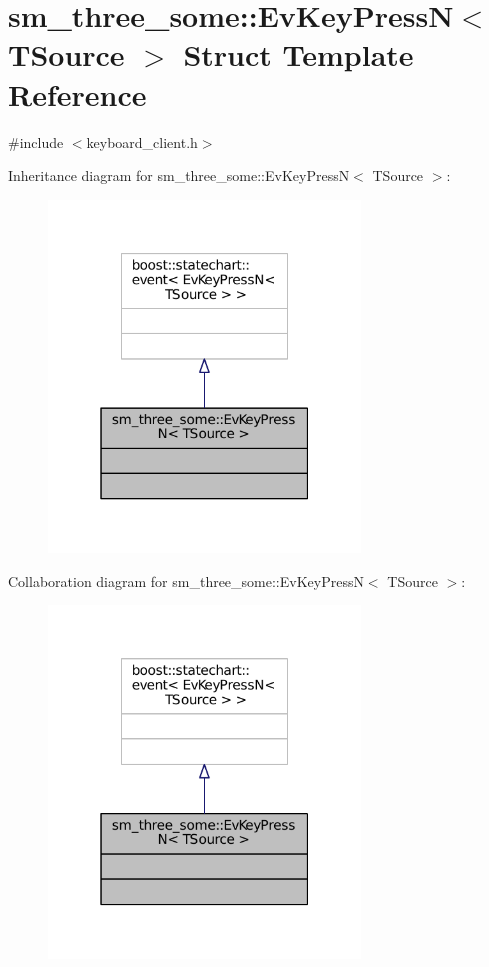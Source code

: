 \hypertarget{structsm__three__some_1_1EvKeyPressN}{}\section{sm\+\_\+three\+\_\+some\+:\+:Ev\+Key\+PressN$<$ T\+Source $>$ Struct Template Reference}
\label{structsm__three__some_1_1EvKeyPressN}


{\ttfamily \#include $<$keyboard\+\_\+client.\+h$>$}



Inheritance diagram for sm\+\_\+three\+\_\+some\+:\+:Ev\+Key\+PressN$<$ T\+Source $>$\+:
\nopagebreak
\begin{figure}[H]
\begin{center}
\leavevmode
\includegraphics[width=235pt]{structsm__three__some_1_1EvKeyPressN__inherit__graph}
\end{center}
\end{figure}


Collaboration diagram for sm\+\_\+three\+\_\+some\+:\+:Ev\+Key\+PressN$<$ T\+Source $>$\+:
\nopagebreak
\begin{figure}[H]
\begin{center}
\leavevmode
\includegraphics[width=235pt]{structsm__three__some_1_1EvKeyPressN__coll__graph}
\end{center}
\end{figure}


